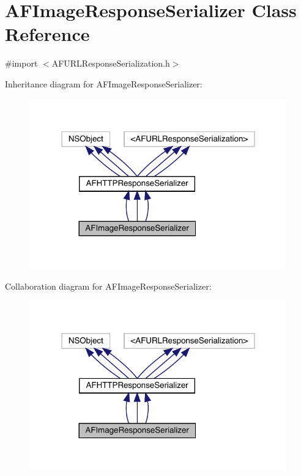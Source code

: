 \hypertarget{interface_a_f_image_response_serializer}{}\section{A\+F\+Image\+Response\+Serializer Class Reference}
\label{interface_a_f_image_response_serializer}


{\ttfamily \#import $<$A\+F\+U\+R\+L\+Response\+Serialization.\+h$>$}



Inheritance diagram for A\+F\+Image\+Response\+Serializer\+:\nopagebreak
\begin{figure}[H]
\begin{center}
\leavevmode
\includegraphics[width=316pt]{interface_a_f_image_response_serializer__inherit__graph}
\end{center}
\end{figure}


Collaboration diagram for A\+F\+Image\+Response\+Serializer\+:\nopagebreak
\begin{figure}[H]
\begin{center}
\leavevmode
\includegraphics[width=316pt]{interface_a_f_image_response_serializer__coll__graph}
\end{center}
\end{figure}
